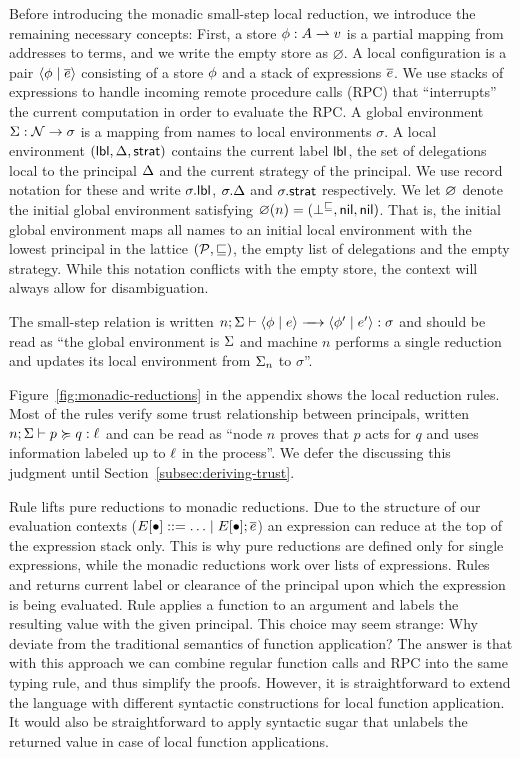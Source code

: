 Before introducing the monadic small-step local reduction, we introduce the remaining necessary concepts: First, a store $\phi: A \rightharpoonup v$ is a partial mapping from addresses to terms, and we write the empty store as $\varnothing$. A local configuration is a pair $\langle \phi \mid \overline{e} \rangle$ consisting of a store $\phi$ and a stack of expressions $\overline{e}$. We use stacks of expressions to handle incoming remote procedure calls (RPC) that ``interrupts'' the current computation in order to evaluate the RPC. A global environment $\Sigma: \mathcal{N} \to \sigma$ is a mapping from names to local environments $\sigma$. A local environment $(\mathsf{lbl}, \Delta, \mathsf{strat})$ contains the current label $\mathsf{lbl}$, the set of delegations local to the principal $\Delta$ and the current strategy of the principal. We use record notation for these and write $\sigma.\mathsf{lbl}$, $\sigma.\Delta$ and $\sigma.\mathsf{strat}$ respectively. We let $\varnothing$ denote the initial global environment satisfying $\varnothing(n) = (\bot^{\sqsubseteq}, \mathsf{nil}, \mathsf{nil})$. That is, the initial global environment maps all names to an initial local environment with the lowest principal in the lattice $(\mathcal{P}, \sqsubseteq)$, the empty list of delegations and the empty strategy. While this notation conflicts with the empty store, the context will always allow for disambiguation.

The small-step relation is written $\step{n; \env}{\config{\store}{\expr}}{\config{\store'}{\expr'}}{\sigma}$ and should be read as ``the global environment is $\Sigma$ and machine $n$ performs a single reduction and updates its local environment from $\Sigma_n$ to $\sigma$''.

Figure~\ref{fig:monadic-reductions} in the appendix shows the local reduction rules. Most of the rules verify some trust relationship between principals, written $n; \Sigma \vdash p \succcurlyeq q : \ell$ and can be read as ``node $n$ proves that $p$ acts for $q$ and uses information labeled up to $\ell$ in the process''. We defer the discussing this judgment until Section~\ref{subsec:deriving-trust}.

Rule  lifts pure reductions to monadic reductions. Due to the structure of our evaluation contexts ($E \lbrack \bullet \rbrack ::= \ldots \mid E \lbrack \bullet \rbrack ; \overline{e}$) an expression can reduce at the top of the expression stack only. This is why pure reductions are defined only for single expressions, while the monadic reductions work over lists of expressions. Rules  and  returns current label or clearance of the principal upon which the expression is being evaluated. Rule  applies a function to an argument and labels the resulting value with the given principal. This choice may seem strange: Why deviate from the traditional semantics of function application? The answer is that with this approach we can combine regular function calls and RPC into the same typing rule, and thus simplify the proofs. However, it is straightforward to extend the language with different syntactic constructions for local function application. It would also be straightforward to apply syntactic sugar that unlabels the returned value in case of local function applications.

